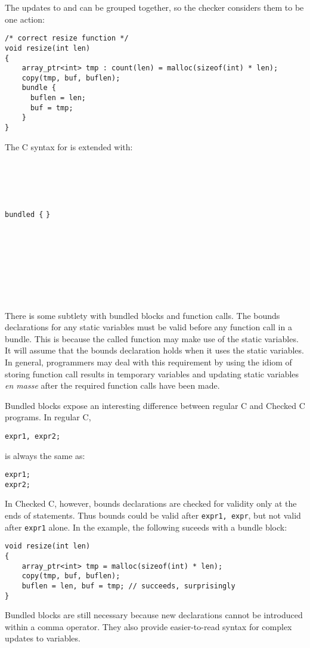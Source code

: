 The updates to  and  can be grouped together,
so the checker considers them to be one action:
\begin{lstlisting}
/* correct resize function */
void resize(int len)
{
    array_ptr<int> tmp : count(len) = malloc(sizeof(int) * len);
    copy(tmp, buf, buflen);
    bundle {
      buflen = len;
      buf = tmp;
    }
}
\end{lstlisting}

The C syntax for is extended with:
\begin{tabbing}
\=\\
\> \\
\\
 \\
\>\lstinline|bundled {|  \lstinline|}| \\
\\
\\
\>  \\
\>  \\
\\
\\
\> \\
\> 
\end{tabbing}

There is some subtlety with bundled blocks and function calls. The
bounds declarations for any static variables must be valid before any
function call in a bundle. This is because the called function may make
use of the static variables. It will assume that the bounds declaration
holds when it uses the static variables. In general, programmers may
deal with this requirement by using the idiom of storing function call
results in temporary variables and updating static variables \textit{en
masse} after the required function calls have been made.

Bundled blocks expose an interesting difference between regular C
and Checked C programs.  In regular C,
\begin{lstlisting}
expr1, expr2;
\end{lstlisting}

is always the same as:

\begin{lstlisting}
expr1;
expr2;
\end{lstlisting}

In Checked C, however, bounds declarations are checked for validity only at the ends of
statements.  Thus bounds could be valid after
\lstinline+expr1, expr+, but not valid after \lstinline+expr1+ alone.
In the  example, the following suceeds with a bundle
block:
\begin{lstlisting}
void resize(int len)
{
    array_ptr<int> tmp = malloc(sizeof(int) * len);
    copy(tmp, buf, buflen);
    buflen = len, buf = tmp; // succeeds, surprisingly
}
\end{lstlisting}
Bundled blocks are still necessary because new declarations
cannot be introduced within a comma operator.  They also provide
easier-to-read syntax for complex updates to variables.

